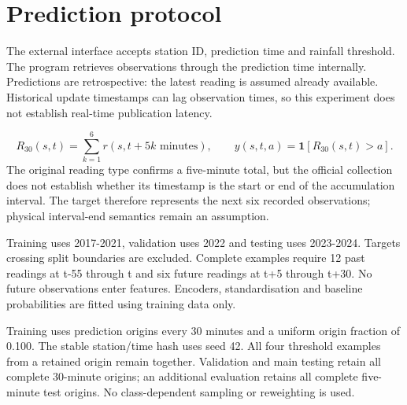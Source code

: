 \documentclass[11pt,a4paper]{article}
\begin{document}
\begin{table}[H]\centering\small
\caption{Positive-value audit; absence of a flag does not establish climate-data validity}
\end{table}
\section{Prediction protocol}
The external interface accepts station ID, prediction time and rainfall threshold. The program retrieves observations through the prediction time internally. Predictions are retrospective: the latest reading is assumed already available. Historical update timestamps can lag observation times, so this experiment does not establish real-time publication latency.

\[R_{30}(s,t)=\sum_{k=1}^{6}r(s,t+5k\text{ minutes}),\qquad y(s,t,a)=\mathbf{1}[R_{30}(s,t)>a].\]
The original reading type confirms a five-minute total, but the official collection does not establish whether its timestamp is the start or end of the accumulation interval. The target therefore represents the next six recorded observations; physical interval-end semantics remain an assumption.

Training uses 2017-2021, validation uses 2022 and testing uses 2023-2024. Targets crossing split boundaries are excluded. Complete examples require 12 past readings at t-55 through t and six future readings at t+5 through t+30. No future observations enter features. Encoders, standardisation and baseline probabilities are fitted using training data only.

Training uses prediction origins every 30 minutes and a uniform origin fraction of 0.100. The stable station/time hash uses seed 42. All four threshold examples from a retained origin remain together. Validation and main testing retain all complete 30-minute origins; an additional evaluation retains all complete five-minute test origins. No class-dependent sampling or reweighting is used.
\end{document}
